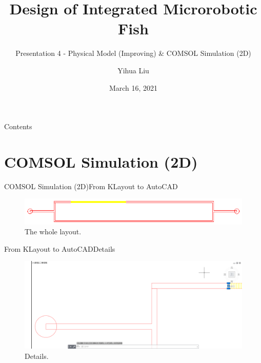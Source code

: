 \documentclass[10pt]{beamer}
\begin{document}
\newcommand{\minitab}[2][l]{\begin{tabular}{#1}#2\end{tabular}}
\title{Design of Integrated Microrobotic Fish}
\subtitle{Presentation 4 - Physical Model (Improving) \& COMSOL Simulation (2D)}
\author{Yihua Liu}
\date{March 16, 2021}
\maketitle
\begin{frame}{Contents}
    \tableofcontents
\end{frame}
\section{COMSOL Simulation (2D)}
\begin{frame}{COMSOL Simulation (2D)}{From KLayout to AutoCAD}
    \begin{figure}
        \includegraphics[width=\textwidth]{1.eps}
        \caption{The whole layout.}
    \end{figure}
\end{frame}
\begin{frame}{From KLayout to AutoCAD}{Details}
    \begin{figure}
        \includegraphics[width=\textwidth]{2.png}
        \caption{Details.}
    \end{figure}
\end{frame}
\end{document}
